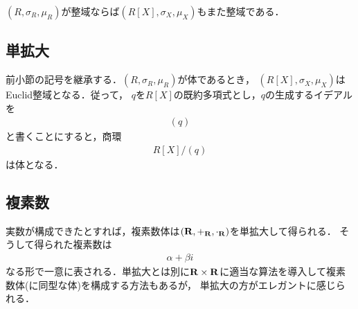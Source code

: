 	$(R,\sigma_R,\mu_R)$が整域ならば$(R[X],\sigma_X,\mu_X)$もまた整域である．

\subsection{単拡大}
	前小節の記号を継承する．$(R,\sigma_R,\mu_R)$が体であるとき，
	$(R[X],\sigma_X,\mu_X)$はEuclid整域となる．従って，
	$q$を$R[X]$の既約多項式とし，$q$の生成するイデアルを
	\begin{align}
		(q)
	\end{align}
	と書くことにすると，商環
	\begin{align}
		R[X]/(q)
	\end{align}
	は体となる．
	
\subsection{複素数}
	実数が構成できたとすれば，複素数体は$(\mathbf{R},+_{\mathbf{R}},\cdot_{\mathbf{R}})$を単拡大して得られる．
	そうして得られた複素数は
	\begin{align}
		\alpha + \beta i
	\end{align}
	なる形で一意に表される．単拡大とは別に$\mathbf{R} \times \mathbf{R}$に適当な算法を導入して複素数体(に同型な体)を構成する方法もあるが，
	単拡大の方がエレガントに感じられる．

\newpage